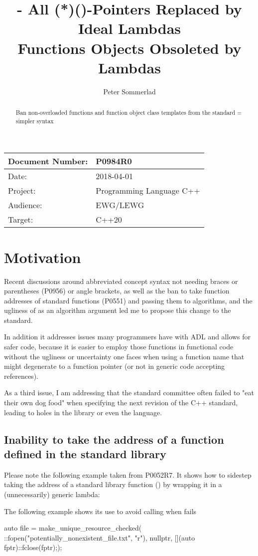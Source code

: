 \documentclass[ebook,11pt,article]{memoir}
\title{\papernumber{} - All (*)()-Pointers Replaced by Ideal Lambdas\\
Functions Objects Obsoleted by Lambdas}
\author{Peter Sommerlad}
\date{\paperdate}                        %
\newcommand{\papernumber}{P0984R0}
\newcommand{\paperdate}{2018-04-01}
\begin{document}
\maketitle
\begin{tabular}[t]{|l|l|}\hline 
Document Number:& \papernumber  \\\hline
Date: & \paperdate \\\hline
Project: & Programming Language C++\\\hline 
Audience: & EWG/LEWG\\\hline
Target: & C++20\\\hline
\end{tabular}

\begin{abstract}
Ban non-overloaded functions and  function object class templates from the standard = simpler syntax
\end{abstract}

\chapter{Motivation}


Recent discussions around abbreviated concept syntax not needing braces or parentheses (P0956) or angle brackets, as well as the ban to take function addresses of standard functions (P0551) and passing them to algorithms, and the ugliness of  as an algorithm argument led me to propose this change to the standard.

In addition it addresses issues many programmers have with ADL and allows for safer code, because it is easier to employ those functions in functional code without the ugliness or uncertainty one faces when using a function name that might degenerate to a function pointer (or not in generic code accepting references).

As a third issue, I am addressing that the standard committee often failed to "eat their own dog food" when specifying the next revision of the C++ standard, leading to holes in the library or even the language.


\section{Inability to take the address of a function defined in the standard library}
Please note the following example taken from P0052R7. It shows how to sidestep taking the address of a standard library function () by wrapping it in a (unnecessarily) generic lambda:
\begin{example}
The following example shows its use to avoid calling  when  fails
\begin{codeblock}
auto file = make_unique_resource_checked(
  ::fopen("potentially_nonexistent_file.txt", "r"), 
  nullptr, [](auto fptr){::fclose(fptr);});
\end{codeblock}
\end{example}
\end{document}
